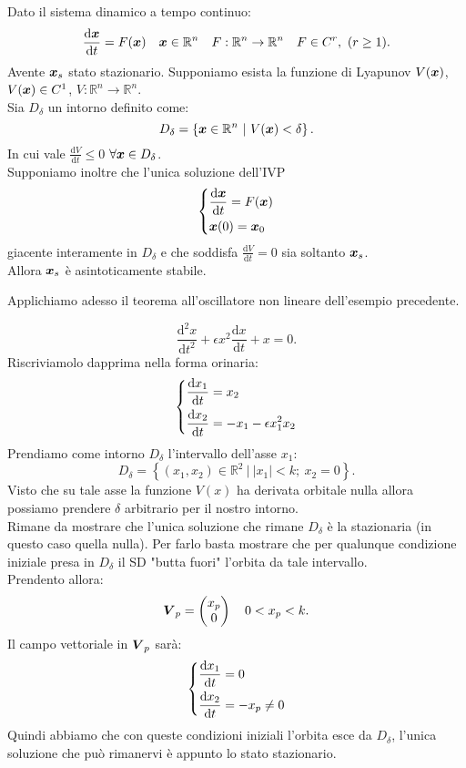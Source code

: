 \begin{thm}
    Dato il sistema dinamico a tempo continuo:
    \[
	\frac{\text{d} \boldsymbol{x}}{\text{d} t} = F(\boldsymbol{x}) \quad  \boldsymbol{x}\in \mathbb{R}^n \quad  F:\mathbb{R}^n\to \mathbb{R}^n \quad  
	F \in C^r, \ (r\ge 1) 
    .\] 
    Avente $\boldsymbol{x}_s$ stato stazionario. Supponiamo esista la funzione di Lyapunov $V(\boldsymbol{x})$, $V(\boldsymbol{x}) \in C^1$, $V:\mathbb{R}^n\to \mathbb{R}^n$.\\
    Sia $D_\delta$ un intorno definito come:
    \[
	D_\delta  = \left\{\boldsymbol{x}\in \mathbb{R}^n \ | \ V(\boldsymbol{x}) < \delta\right\}
    .\] 
    In cui vale $\frac{\text{d} V}{\text{d} t} \le 0$ $\forall \boldsymbol{x} \in D_\delta$. \\
    Supponiamo inoltre che l'unica soluzione dell'IVP
    \[
    \begin{dcases}
	\frac{\text{d} \boldsymbol{x}}{\text{d} t} = F(\boldsymbol{x}) \\
	\boldsymbol{x}(0) = \boldsymbol{x}_0
    \end{dcases}
    \]
    giacente interamente in $D_\delta$ e che soddisfa $\frac{\text{d} V}{\text{d} t} = 0 $  sia soltanto $\boldsymbol{x}_s$.\\
    Allora $\boldsymbol{x}_s$ è asintoticamente stabile.
\end{thm}
\noindent
Applichiamo adesso il teorema all'oscillatore non lineare dell'esempio precedente.
\begin{exmp}
    \[
        \frac{\text{d} ^2x}{\text{d} t^2} + \epsilon  x^2\frac{\text{d} x}{\text{d} t} + x = 0 
    .\] 
    Riscriviamolo dapprima nella forma orinaria:
    \[
    \begin{dcases}
    \frac{\text{d} x_1}{\text{d} t} = x_2\\
    \frac{\text{d} x_2}{\text{d} t} = - x_1 - \epsilon x_1^2x_2
    \end{dcases}
    \]
    Prendiamo come intorno $D_\delta$ l'intervallo dell'asse $x_1$:
    \[
	D_\delta  = \left\{(x_1, x_2) \in \mathbb{R}^2 \ | \ \left|x_1\right| < k; \ x_2 = 0  \right\}
    .\] 
    Visto che su tale asse la funzione $V(x)$ ha derivata orbitale nulla allora possiamo prendere $\delta$ arbitrario per il nostro intorno. \\
    Rimane da mostrare che l'unica soluzione che rimane $D_\delta$ è la stazionaria (in questo caso quella nulla). Per farlo basta mostrare che per qualunque condizione iniziale presa in $D_\delta$ il SD "butta fuori" l'orbita da tale intervallo.\\
    Prendento allora:
    \[
        \boldsymbol{V}_p = \begin{pmatrix} x_p \\ 0 \end{pmatrix} \quad  0 < x_p < k
    .\] 
    Il campo vettoriale in $\boldsymbol{V}_p$ sarà:
    \[
    \begin{dcases}
    \frac{\text{d} x_1}{\text{d} t} = 0\\
    \frac{\text{d} x_2}{\text{d} t} = - x_p \neq 0
    \end{dcases}
    \]
    Quindi abbiamo che con queste condizioni iniziali l'orbita esce da $D_\delta$, l'unica soluzione che può rimanervi è appunto lo stato stazionario. 
\end{exmp}
